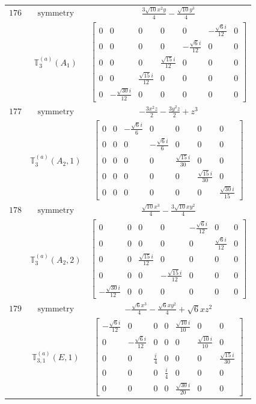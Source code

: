 \documentclass[fleqn,8pt,landscape]{jsarticle}
\begin{document}
\begin{longtable}{ccc}
$ 176 $ & $ \text{symmetry} $ & $ \frac{3 \sqrt{10} x^{2} y}{4} - \frac{\sqrt{10} y^{3}}{4} $ \\
$  $ & $ \mathbb{T}_{3}^{(a)}(A_{1}) $ & $ \begin{bmatrix} 0 & 0 & 0 & 0 & 0 & - \frac{\sqrt{6} i}{12} & 0 \\ 0 & 0 & 0 & 0 & - \frac{\sqrt{6} i}{12} & 0 & 0 \\ 0 & 0 & 0 & \frac{\sqrt{15} i}{12} & 0 & 0 & 0 \\ 0 & 0 & \frac{\sqrt{15} i}{12} & 0 & 0 & 0 & 0 \\ 0 & - \frac{\sqrt{30} i}{12} & 0 & 0 & 0 & 0 & 0 \end{bmatrix} $ \\ \hline
$ 177 $ & $ \text{symmetry} $ & $ - \frac{3 x^{2} z}{2} - \frac{3 y^{2} z}{2} + z^{3} $ \\
$  $ & $ \mathbb{T}_{3}^{(a)}(A_{2},1) $ & $ \begin{bmatrix} 0 & 0 & - \frac{\sqrt{6} i}{6} & 0 & 0 & 0 & 0 \\ 0 & 0 & 0 & - \frac{\sqrt{6} i}{6} & 0 & 0 & 0 \\ 0 & 0 & 0 & 0 & \frac{\sqrt{15} i}{30} & 0 & 0 \\ 0 & 0 & 0 & 0 & 0 & \frac{\sqrt{15} i}{30} & 0 \\ 0 & 0 & 0 & 0 & 0 & 0 & \frac{\sqrt{30} i}{15} \end{bmatrix} $ \\ \hline
$ 178 $ & $ \text{symmetry} $ & $ \frac{\sqrt{10} x^{3}}{4} - \frac{3 \sqrt{10} x y^{2}}{4} $ \\
$  $ & $ \mathbb{T}_{3}^{(a)}(A_{2},2) $ & $ \begin{bmatrix} 0 & 0 & 0 & 0 & - \frac{\sqrt{6} i}{12} & 0 & 0 \\ 0 & 0 & 0 & 0 & 0 & \frac{\sqrt{6} i}{12} & 0 \\ 0 & 0 & \frac{\sqrt{15} i}{12} & 0 & 0 & 0 & 0 \\ 0 & 0 & 0 & - \frac{\sqrt{15} i}{12} & 0 & 0 & 0 \\ - \frac{\sqrt{30} i}{12} & 0 & 0 & 0 & 0 & 0 & 0 \end{bmatrix} $ \\ \hline
$ 179 $ & $ \text{symmetry} $ & $ - \frac{\sqrt{6} x^{3}}{4} - \frac{\sqrt{6} x y^{2}}{4} + \sqrt{6} x z^{2} $ \\
$  $ & $ \mathbb{T}_{3,1}^{(a)}(E,1) $ & $ \begin{bmatrix} - \frac{\sqrt{6} i}{12} & 0 & 0 & 0 & \frac{\sqrt{10} i}{10} & 0 & 0 \\ 0 & - \frac{\sqrt{6} i}{12} & 0 & 0 & 0 & \frac{\sqrt{10} i}{10} & 0 \\ 0 & 0 & \frac{i}{4} & 0 & 0 & 0 & \frac{\sqrt{15} i}{30} \\ 0 & 0 & 0 & \frac{i}{4} & 0 & 0 & 0 \\ 0 & 0 & 0 & 0 & \frac{\sqrt{30} i}{20} & 0 & 0 \end{bmatrix} $ \\ \hline

\end{longtable}
\end{document}
